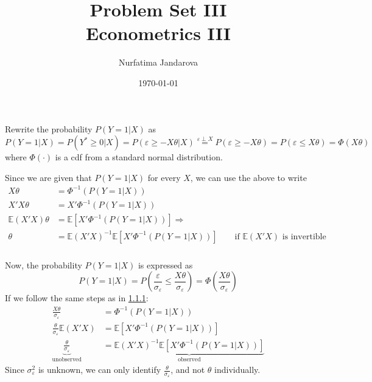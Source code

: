 \documentclass[]{article}
\title{Problem Set III \\ \large Econometrics III}
\author{Nurfatima Jandarova}
\date{\today}
\begin{document}
\maketitle

\section{}
\subsection{}
\subsubsection{}
\label{sec:1.1.1}
Rewrite the probability $P(Y = 1|X)$ as
\begin{equation}
	P(Y = 1|X) = P(Y^*\geq 0|X) = P(\varepsilon\geq-X\theta|X) \overset{\varepsilon\perp X}{=} P(\varepsilon\geq-X\theta) = P(\varepsilon\leq X\theta) = \Phi(X\theta)\nonumber
\end{equation}
where $\Phi(\cdot)$ is a cdf from a standard normal distribution.

Since we are given that $P(Y = 1|X)$ for every $X$, we can use the above to write
\begin{equation}
	\begin{split}
		X\theta& = \Phi^{-1}(P(Y = 1|X))\nonumber \\
		X'X\theta& = X'\Phi^{-1}(P(Y = 1|X)) \\
		\mathbb{E}(X'X)\theta& = \mathbb{E}\left[X'\Phi^{-1}(P(Y = 1|X))\right] \Rightarrow\\
		\theta& = \mathbb{E}(X'X)^{-1}\mathbb{E}\left[X'\Phi^{-1}(P(Y = 1|X))\right] \qquad\text{if $\mathbb{E}(X'X)$ is invertible}
	\end{split}
\end{equation}

\subsubsection{}
Now, the probability $P(Y = 1|X)$  is expressed as
\begin{equation}
	P(Y = 1|X) = P\left(\frac{\varepsilon}{\sigma_\varepsilon}\leq \frac{X\theta}{\sigma_\varepsilon}\right) = \Phi\left(\frac{X\theta}{\sigma_\varepsilon}\right)\nonumber
\end{equation}
If we follow the same steps as in \ref{sec:1.1.1}:
\begin{equation}
	\begin{split}
		\frac{X\theta}{\sigma_\varepsilon}& = \Phi^{-1}\left(P(Y = 1|X)\right) \\ \nonumber
		\frac{\theta}{\sigma_\varepsilon}\mathbb{E}(X'X)& = \mathbb{E}\left[X'\Phi^{-1}\left(P(Y = 1|X)\right)\right] \\
		\underbrace{\frac{\theta}{\sigma_\varepsilon}}_{\text{unobserved}}& = \underbrace{\mathbb{E}(X'X)^{-1}\mathbb{E}\left[X'\Phi^{-1}\left(P(Y = 1|X)\right)\right]}_{\text{observed}}
	\end{split}
\end{equation}
Since $\sigma_\varepsilon^2$ is unknown, we can only identify $\frac{\theta}{\sigma_\varepsilon}$, and not $\theta$ individually.
\end{document}
